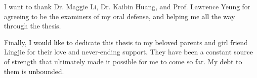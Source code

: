 I want to thank Dr. Maggie Li, Dr. Kaibin Huang, and Prof. Lawrence Yeung 
for agreeing to be the examiners of my oral defense, and  helping me all the way through the thesis. %

Finally, I would like to dedicate this thesis to my beloved parents and girl friend Lingjie for their love and never-ending support.
They have been a constant source of strength that ultimately made it possible for me to come so far. 
My debt to them is unbounded.

